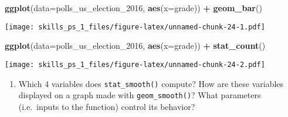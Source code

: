 \documentclass[
]{article}
\newenvironment{Shaded}{\begin{snugshade}}{\end{snugshade}}
\newcommand{\DataTypeTok}[1]{\textcolor[rgb]{0.13,0.29,0.53}{#1}}
\newcommand{\DecValTok}[1]{\textcolor[rgb]{0.00,0.00,0.81}{#1}}
\newcommand{\KeywordTok}[1]{\textcolor[rgb]{0.13,0.29,0.53}{\textbf{#1}}}
\newcommand{\NormalTok}[1]{#1}
\newcommand{\OperatorTok}[1]{\textcolor[rgb]{0.81,0.36,0.00}{\textbf{#1}}}
\newcommand{\StringTok}[1]{\textcolor[rgb]{0.31,0.60,0.02}{#1}}
\providecommand{\tightlist}{%
  \setlength{\itemsep}{0pt}\setlength{\parskip}{0pt}}
\begin{document}
\begin{Shaded}
\begin{Highlighting}[]
\KeywordTok{ggplot}\NormalTok{(}\DataTypeTok{data=}\NormalTok{polls_us_election_}\DecValTok{2016}\NormalTok{, }\KeywordTok{aes}\NormalTok{(}\DataTypeTok{x=}\NormalTok{grade)) }\OperatorTok{+}\StringTok{ }\KeywordTok{geom_bar}\NormalTok{()}
\end{Highlighting}
\end{Shaded}

\texttt{[image: skills\_ps\_1\_files/figure-latex/unnamed-chunk-24-1.pdf]}

\begin{Shaded}
\begin{Highlighting}[]
\KeywordTok{ggplot}\NormalTok{(}\DataTypeTok{data=}\NormalTok{polls_us_election_}\DecValTok{2016}\NormalTok{, }\KeywordTok{aes}\NormalTok{(}\DataTypeTok{x=}\NormalTok{grade)) }\OperatorTok{+}\StringTok{ }\KeywordTok{stat_count}\NormalTok{()}
\end{Highlighting}
\end{Shaded}

\texttt{[image: skills\_ps\_1\_files/figure-latex/unnamed-chunk-24-2.pdf]}

\begin{enumerate}
\def\labelenumi{\arabic{enumi}.}
\tightlist
\item
  Which 4 variables does \texttt{stat\_smooth()} compute? How are these
  variables displayed on a graph made with \texttt{geom\_smooth()}? What
  parameters (i.e.~inputs to the function) control its behavior?
\end{enumerate}
\end{document}

